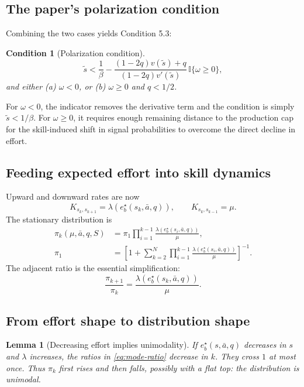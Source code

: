 \documentclass[11pt]{article}
\theoremstyle{tutorial}
\newtheorem{lemma}[theorem]{Lemma}
\newtheorem{condition}[theorem]{Condition}
\theoremstyle{remark}
\newcommand{\1}{\mathbb{I}}
\begin{document}
\subsection{The paper's polarization condition}

Combining the two cases yields Condition 5.3:
\begin{condition}[Polarization condition]
\[
\tilde s<\frac1\beta-
\frac{(1-2q)v(\tilde s)+q}{(1-2q)v'(\tilde s)}\,
\1\{\omega\ge0\},
\]
and either (a) $\omega<0$, or (b) $\omega\ge0$ and $q<1/2$.
\end{condition}
For $\omega<0$, the indicator removes the derivative term and the condition is simply
$\tilde s<1/\beta$.  For $\omega\ge0$, it requires enough remaining distance to the production cap for the
skill-induced shift in signal probabilities to overcome the direct decline in effort.

\subsection{Feeding expected effort into skill dynamics}

Upward and downward rates are now
\[
K_{s_k,s_{k+1}}=\lambda(e_b^\star(s_k,\bar a,q)),
\qquad K_{s_k,s_{k-1}}=\mu.
\]
The stationary distribution is
\begin{align*}
\pi_k(\mu,\bar a,q,S)&=\pi_1\prod_{i=1}^{k-1}
\frac{\lambda(e_b^\star(s_i,\bar a,q))}{\mu},\\
\pi_1&=\left[1+\sum_{k=2}^N\prod_{i=1}^{k-1}
\frac{\lambda(e_b^\star(s_i,\bar a,q))}{\mu}\right]^{-1}.
\end{align*}
The adjacent ratio is the essential simplification:
\begin{equation}
\boxed{
\frac{\pi_{k+1}}{\pi_k}=
\frac{\lambda(e_b^\star(s_k,\bar a,q))}{\mu}.}
\label{eq:mode-ratio}
\end{equation}

\subsection{From effort shape to distribution shape}

\begin{lemma}[Decreasing effort implies unimodality]
If $e_b^\star(s,\bar a,q)$ decreases in $s$ and $\lambda$ increases, the ratios in
\eqref{eq:mode-ratio} decrease in $k$.  They cross $1$ at most once.  Thus $\pi_k$ first rises and then falls,
possibly with a flat top: the distribution is unimodal.
\end{lemma}
\end{document}
